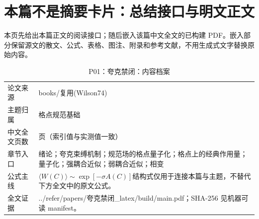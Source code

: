 \documentclass[UTF8,11pt,oneside]{ctexbook}
\begin{document}
\section*{本篇不是摘要卡片：总结接口与明文正文}
本页先给出本篇正文的阅读接口；随后嵌入该篇中文全文的已构建 PDF。嵌入部分保留源文的散文、公式、表格、图注、附录和参考文献，不用生成式文字替换原始内容。
\begin{table}[htbp]
  \centering
  \caption{P01：夸克禁闭：内容档案}
  \small
  \begin{tabularx}{0.96\textwidth}{@{}p{3.3cm}>{\raggedright\arraybackslash}X@{}}
    \toprule
    论文来源 & books/复用(Wilson74) \\
    主题归属 & 格点规范基础 \\
    中文全文页数 & 24 页（索引值与实测值一致） \\
    章节入口 & 绪论；夸克束缚机制；规范场的格点量子化；格点上的经典作用量；量子化；强耦合近似；弱耦合近似；相变 \\
    公式主线 & $\langle W(C)\rangle\sim\exp[-\sigma A(C)]$\newline\scriptsize 结构式仅用于连接本篇与主题，不替代下方全文中的原文公式。 \\
    全文证据 & ../\allowbreak{}refer/\allowbreak{}papers/\allowbreak{}夸克禁闭\_\allowbreak{}latex/\allowbreak{}build/\allowbreak{}main.pdf；SHA-256 见机器可读 manifest。 \\
    \bottomrule
  \end{tabularx}
\end{table}
\end{document}
